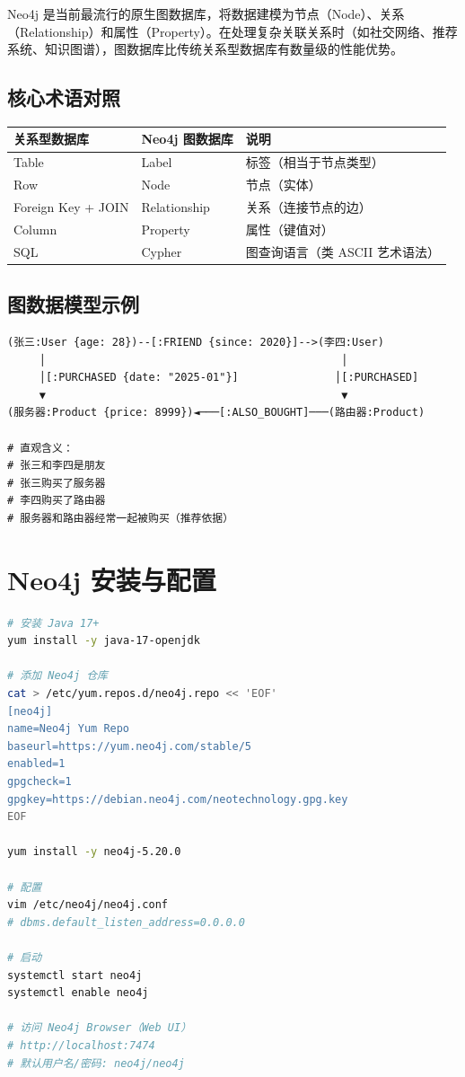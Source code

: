 \documentclass[12pt,UTF8]{ctexbook}
\begin{document}
Neo4j 是当前最流行的原生图数据库，将数据建模为节点（Node）、关系（Relationship）和属性（Property）。在处理复杂关联关系时（如社交网络、推荐系统、知识图谱），图数据库比传统关系型数据库有数量级的性能优势。

\subsection*{核心术语对照}

\begin{tabular}{|l|l|l|}
\hline
\textbf{关系型数据库} & \textbf{Neo4j 图数据库} & \textbf{说明} \\
\hline
Table & Label & 标签（相当于节点类型） \\
\hline
Row & Node & 节点（实体） \\
\hline
Foreign Key + JOIN & Relationship & 关系（连接节点的边） \\
\hline
Column & Property & 属性（键值对） \\
\hline
SQL & Cypher & 图查询语言（类 ASCII 艺术语法） \\
\hline
\end{tabular}

\subsection*{图数据模型示例}

\begin{lstlisting}
(张三:User {age: 28})--[:FRIEND {since: 2020}]-->(李四:User)
     │                                              │
     │[:PURCHASED {date: "2025-01"}]               │[:PURCHASED]
     ▼                                              ▼
(服务器:Product {price: 8999})◄───[:ALSO_BOUGHT]───(路由器:Product)

# 直观含义：
# 张三和李四是朋友
# 张三购买了服务器
# 李四购买了路由器
# 服务器和路由器经常一起被购买（推荐依据）
\end{lstlisting}

\section{Neo4j 安装与配置}
\label{sec:neo4j-install}

\begin{lstlisting}[language=bash]
# 安装 Java 17+
yum install -y java-17-openjdk

# 添加 Neo4j 仓库
cat > /etc/yum.repos.d/neo4j.repo << 'EOF'
[neo4j]
name=Neo4j Yum Repo
baseurl=https://yum.neo4j.com/stable/5
enabled=1
gpgcheck=1
gpgkey=https://debian.neo4j.com/neotechnology.gpg.key
EOF

yum install -y neo4j-5.20.0

# 配置
vim /etc/neo4j/neo4j.conf
# dbms.default_listen_address=0.0.0.0

# 启动
systemctl start neo4j
systemctl enable neo4j

# 访问 Neo4j Browser（Web UI）
# http://localhost:7474
# 默认用户名/密码: neo4j/neo4j
\end{lstlisting}
\end{document}
